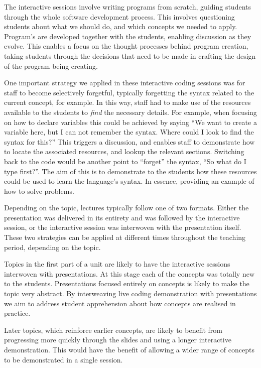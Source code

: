 The interactive sessions involve writing programs from scratch, guiding students through the whole software development process. This involves questioning students about what we should do, and which concepts we needed to apply. Program's are developed together with the students, enabling discussion as they evolve. This enables a focus on the thought processes behind program creation, taking students through the decisions that need to be made in crafting the design of the program being creating.

One important strategy we applied in these interactive coding sessions was for staff to become selectively forgetful, typically forgetting the syntax related to the current concept, for example. In this way, staff had to make use of the resources available to the students to \emph{find} the necessary details. For example, when focusing on how to declare variables this could be achieved by saying ``We want to create a variable here, but I can not remember the syntax. Where could I look to find the syntax for this?'' This triggers a discussion, and enables staff to demonstrate how to locate the associated resources, and lookup the relevant sections. Switching back to the code would be another point to ``forget'' the syntax, ``So what do I type first?''. The aim of this is to demonstrate to the students how these resources could be used to learn the language's syntax. In essence, providing an example of how to solve problems.

Depending on the topic, lectures typically follow one of two formats. Either the presentation was delivered in its entirety and was followed by the interactive session, or the interactive session was interwoven with the presentation itself. These two strategies can be applied at different times throughout the teaching period, depending on the topic. 

Topics in the first part of a unit are likely to have the interactive sessions interwoven with presentations. At this stage each of the concepts was totally new to the students. Presentations focused entirely on concepts is likely to make the topic very abstract. By interweaving live coding demonstration with presentations we aim to address student apprehension about how concepts are realised in practice.

Later topics, which reinforce earlier concepts, are likely to benefit from progressing more quickly through the slides and using a longer interactive demonstration. This would have the benefit of allowing a wider range of concepts to be demonstrated in a single session.

